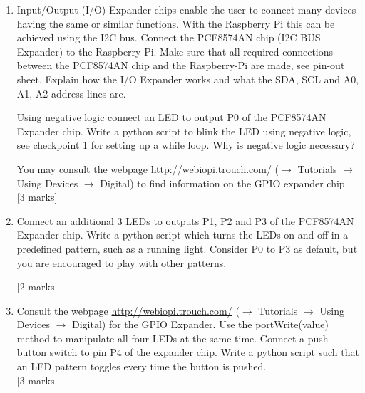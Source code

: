 \begin{enumerate}


\item [4.1.] Input/Output (I/O) Expander chips enable the user to connect many devices having the same or similar functions.  With the Raspberry Pi this can be achieved using the I2C bus. Connect the PCF8574AN chip  (I2C BUS Expander) to the Raspberry-Pi. Make sure that all required connections between the PCF8574AN chip and the Raspberry-Pi are made, see pin-out sheet. Explain how the I/O Expander works and what the SDA, SCL and A0, A1, A2 address lines are. 

Using negative logic connect an LED to output P0 of the PCF8574AN Expander chip. 
Write a python script to blink the LED using negative logic, see checkpoint 1 for setting up a while loop.  Why is negative logic necessary? 

You may consult the \webiopi webpage  \url{http://webiopi.trouch.com/} ($\rightarrow$ Tutorials $\rightarrow$ Using Devices $\rightarrow$ Digital) to find information on the GPIO expander chip. \\


\hfill [3 marks]\\

\item [4.2.] Connect an additional 3 LEDs to outputs P1, P2 and P3 of the PCF8574AN Expander chip. Write a python script which turns the LEDs on and off in a predefined pattern, such as a running light. Consider P0 to P3 as default, but you are encouraged to play with other patterns. 

\hfill [2 marks]\\

\newpage
\item [4.3.] Consult the webpage \url{http://webiopi.trouch.com/} ($\rightarrow$ Tutorials $\rightarrow$ Using Devices $\rightarrow$ Digital) for the GPIO Expander. Use the portWrite(value) method to manipulate all four LEDs at the same time.  Connect a push button switch to pin P4 of the expander chip. Write a python script such that an LED pattern toggles every time the button is pushed.\\


\hfill [3 marks]\\


\end{enumerate}



